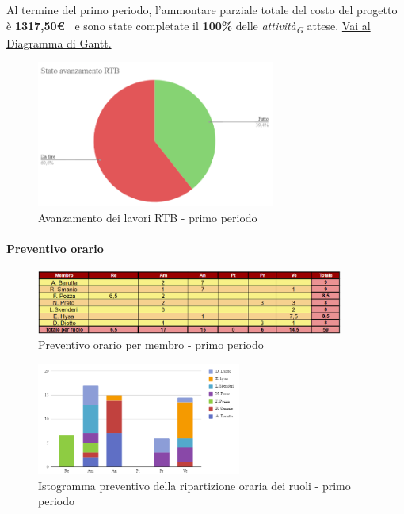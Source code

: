 Al termine del primo periodo, l'ammontare parziale totale del costo del progetto è \textbf{ 1317,50\euro\ } e sono state completate il \textbf{100\%} delle \textit{attività}\textsubscript{\textit{G}} attese.
\href{https://github.com/orgs/ByteOps-swe/projects/3/views/1?sortedBy%5Bdirection%5D=asc&sortedBy%5BcolumnId%5D=64182560}{Vai al Diagramma di Gantt.}
\hspace{1pt}
  \begin{figure}[H]
    \centering
    \begin{minipage}[b]{0.70\textwidth}
        \centering
        \includegraphics[width=0.7\textwidth]{../Images/avanzamento1Periodo.png}
        \caption{Avanzamento dei lavori RTB - primo periodo}
        \label{fig:Avanzamento_RTB_1}
    \end{minipage}
\end{figure}



\paragraph{Preventivo orario} \hspace{1pt}

\begin{figure}[H]
    \centering
    \includegraphics[width=0.9\textwidth]{../Images/preventivoOrario1Periodo.png}
    \caption{Preventivo orario per membro - primo periodo}
    \label{fig:Preventivo_orario_1}
\end{figure}

\begin{figure}[H]
    \centering
    \includegraphics[width=0.6\textwidth]{../Images/preventivoDivisioneRuoli1Periodo.png}
    \caption{Istogramma preventivo della ripartizione oraria dei ruoli - primo periodo}
    \label{fig:Preventivo_ripartizione_oraria_1}
\end{figure}

